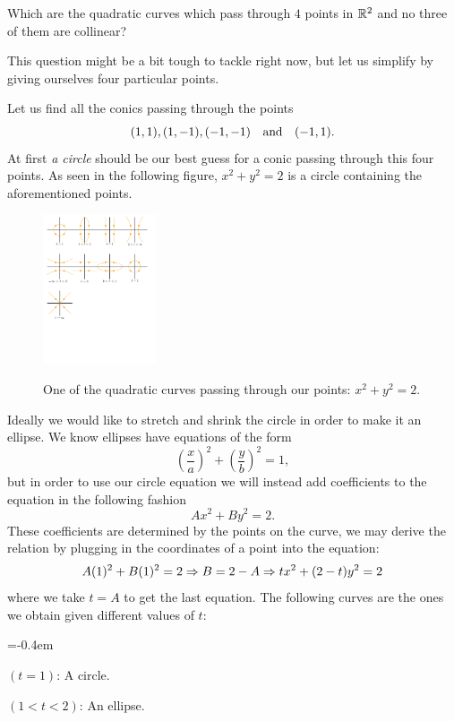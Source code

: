\documentclass[12pt]{memoir}
\begin{document}
\begin{significant}
        Which are the quadratic curves which pass through $4$ points in $\mathbb{R}^2$ and no three of them are collinear?
\end{significant}
    This question might be a bit tough to tackle right now, but let us simplify by giving ourselves four particular points.
    
\begin{Ex}
    Let us find all the conics passing through the points 
    $$(1,1),(1,-1),(-1,-1)\quad\text{and}\quad(-1,1).$$At first \emph{a circle} should be our best guess for a conic passing through this four points. As seen in the following figure, $x^2+y^2=2$ is a circle containing the aforementioned points.
    \begin{figure}[h!]
        \centering
        \includegraphics[width=0.3\textwidth, trim= 0.8cm 22.9cm 16cm 0.6cm,clip]{figs/fig1Intro.pdf}
        \label{fig1Intro}
        \caption{One of the quadratic curves passing through our points: $x^2+y^2=2$.}
    \end{figure}\newpage
    Ideally we would like to stretch and shrink the circle in order to make it an ellipse. We know ellipses have equations of the form 
    $$\left(\frac xa\right)^2+\left(\frac yb\right)^2=1,$$ 
    but in order to use our circle equation we will instead add coefficients to the equation in the following fashion
    $$Ax^2+By^2=2.$$
    These coefficients are determined by the points on the curve, we may derive the relation by plugging in the coordinates of a point into the equation:
    $$A(1)^2+B(1)^2=2\Rightarrow B=2-A\Rightarrow tx^2+(2-t)y^2=2$$
    where we take $t=A$ to get the last equation.
    The following curves are the ones we obtain given different values of $t$:
    \vspace{-0.5em}
    \begin{itemize}
        \begin{multicols}{2}
            \itemsep=-0.4em
        \item $(t=1)$: A circle.
        \item $(1<t<2)$: An ellipse.

\end{multicols}
\end{itemize}
\end{Ex}
\end{document}
